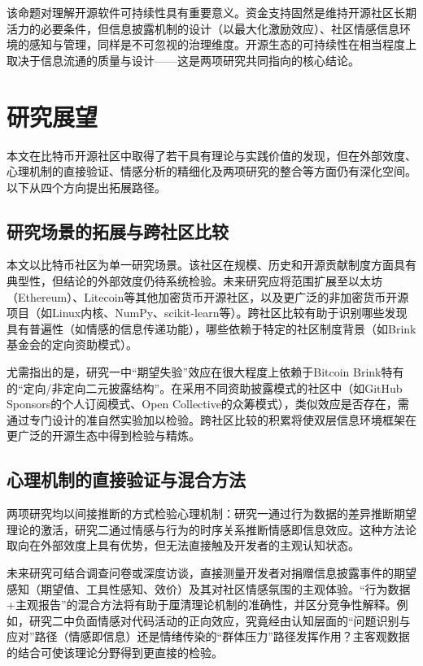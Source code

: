 \documentclass[
    type = master, %
    degree = professional,        %
    decl-page,  %
    twoside,                %
    fontset = fandol %
  ]{njuthesis}
\begin{document}
该命题对理解开源软件可持续性具有重要意义。资金支持固然是维持开源社区长期活力的必要条件，但信息披露机制的设计（以最大化激励效应）、社区情感信息环境的感知与管理，同样是不可忽视的治理维度。开源生态的可持续性在相当程度上取决于信息流通的质量与设计——这是两项研究共同指向的核心结论。

\section{研究展望}

本文在比特币开源社区中取得了若干具有理论与实践价值的发现，但在外部效度、心理机制的直接验证、情感分析的精细化及两项研究的整合等方面仍有深化空间。以下从四个方向提出拓展路径。

\subsection{研究场景的拓展与跨社区比较}

本文以比特币社区为单一研究场景。该社区在规模、历史和开源贡献制度方面具有典型性，但结论的外部效度仍待系统检验。未来研究应将范围扩展至以太坊（Ethereum）、Litecoin等其他加密货币开源社区，以及更广泛的非加密货币开源项目（如Linux内核、NumPy、scikit-learn等）。跨社区比较有助于识别哪些发现具有普遍性（如情感的信息传递功能），哪些依赖于特定的社区制度背景（如Brink基金会的定向资助模式）。

尤需指出的是，研究一中“期望失验”效应在很大程度上依赖于Bitcoin Brink特有的“定向/非定向二元披露结构”。在采用不同资助披露模式的社区中（如GitHub Sponsors的个人订阅模式、Open Collective的众筹模式），类似效应是否存在，需通过专门设计的准自然实验加以检验。跨社区比较的积累将使双层信息环境框架在更广泛的开源生态中得到检验与精炼。

\subsection{心理机制的直接验证与混合方法}

两项研究均以间接推断的方式检验心理机制：研究一通过行为数据的差异推断期望理论的激活，研究二通过情感与行为的时序关系推断情感即信息效应。这种方法论取向在外部效度上具有优势，但无法直接触及开发者的主观认知状态。

未来研究可结合调查问卷或深度访谈，直接测量开发者对捐赠信息披露事件的期望感知（期望值、工具性感知、效价）及其对社区情感氛围的主观体验。“行为数据+主观报告”的混合方法将有助于厘清理论机制的准确性，并区分竞争性解释。例如，研究二中负面情感对代码活动的正向效应，究竟经由认知层面的“问题识别与应对”路径（情感即信息）还是情绪传染的“群体压力”路径发挥作用？主客观数据的结合可使该理论分野得到更直接的检验。
\end{document}
